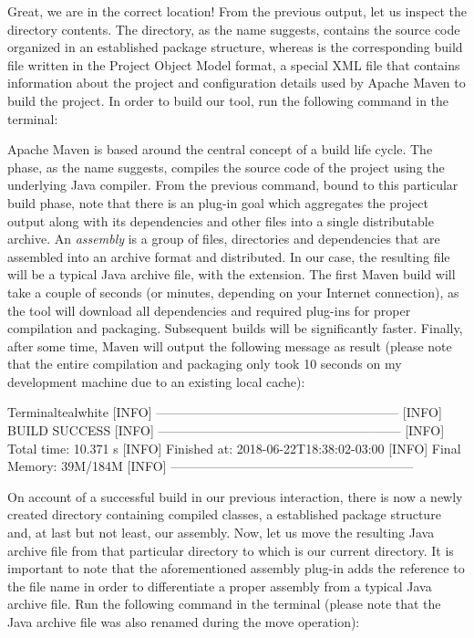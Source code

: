 Great, we are in the correct location! From the previous output, let us inspect the directory contents. The  directory, as the name suggests, contains the source code organized in an established package structure, whereas  is the corresponding build file written in the Project Object Model format, a special XML file that contains information about the project and configuration details used by Apache Maven to build the project. In order to build our tool, run the following command in the terminal:


Apache Maven is based around the central concept of a build life cycle. The  phase, as the name suggests, compiles the source code of the project using the underlying Java compiler. From the previous command, bound to this particular build phase, note that there is an  plug-in goal which aggregates the project output along with its dependencies and other files into a single distributable archive. An \emph{assembly} is a group of files, directories and dependencies that are assembled into an archive format and distributed. In our case, the resulting file will be a typical Java archive file, with the  extension. The first Maven build will take a couple of seconds (or minutes, depending on your Internet connection), as the tool will download all dependencies and required plug-ins for proper compilation and packaging. Subsequent builds will be significantly faster. Finally, after some time, Maven will output the following message as result (please note that the entire compilation and packaging only took 10 seconds on my development machine due to an existing local cache):

\begin{codebox}{Terminal}{teal}{\icnote}{white}
[INFO] ---------------------------------------------------------
[INFO] BUILD SUCCESS
[INFO] ---------------------------------------------------------
[INFO] Total time: 10.371 s
[INFO] Finished at: 2018-06-22T18:38:02-03:00
[INFO] Final Memory: 39M/184M
[INFO] ---------------------------------------------------------
\end{codebox}

On account of a successful build in our previous interaction, there is now a newly created  directory containing compiled classes, a established package structure and, at last but not least, our assembly. Now, let us move the resulting Java archive file from that particular directory to  which is our current directory. It is important to note that the aforementioned assembly plug-in adds the  reference to the file name in order to differentiate a proper assembly from a typical Java archive file. Run the following command in the terminal (please note that the Java archive file was also renamed during the move operation):

